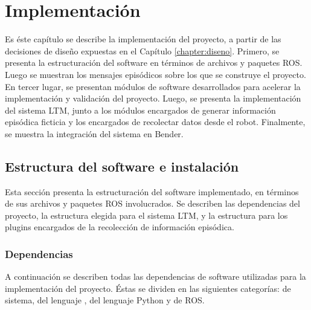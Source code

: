 \chapter{Implementación}\label{chapter:implementacion}

Es éste capítulo se describe la implementación del proyecto, a partir de las decisiones de diseño expuestas en el Capítulo \ref{chapter:diseno}. Primero, se presenta la estructuración del software en términos de archivos y paquetes ROS. Luego se muestran los mensajes episódicos sobre los que se construye el proyecto. En tercer lugar, se presentan módulos de software desarrollados para acelerar la implementación y validación del proyecto. Luego, se presenta la implementación del sistema LTM, junto a los módulos encargados de generar información episódica ficticia y los encargados de recolectar datos desde el robot. Finalmente, se muestra la integración del sistema en Bender.


\section{Estructura del software e instalación}

Esta sección presenta la estructuración del software implementado, en términos de sus archivos y paquetes ROS involucrados. Se describen las dependencias del proyecto, la estructura elegida para el sistema LTM, y la estructura para los plugins encargados de la recolección de información episódica.

\subsection{Dependencias}

A continuación se describen todas las dependencias de software utilizadas para la implementación del proyecto. Éstas se dividen en las siguientes categorías: de sistema, del lenguaje \CC, del lenguaje Python y de ROS.


